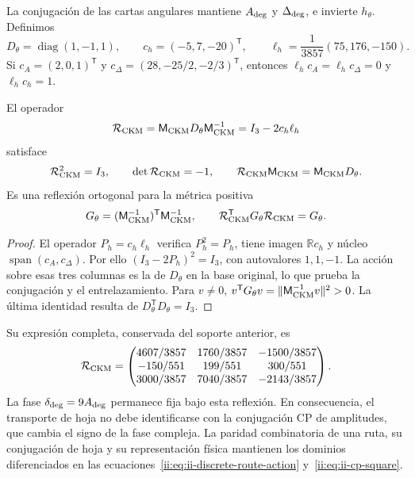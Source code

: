 La conjugación de las cartas angulares mantiene \(A_{\rm deg}\) y
\(\Delta_{\rm deg}\), e invierte \(h_\theta\). Definimos
\begin{equation}
 D_\theta=\operatorname{diag}(1,-1,1),\qquad
 c_h=(-5,7,-20)^{\mathsf T},\qquad
 \ell_h=\frac1{3857}(75,176,-150).
 \label{ii:eq:ii-ckm-sheet-data}
\end{equation}
Si \(c_A=(2,0,1)^{\mathsf T}\) y
\(c_\Delta=(28,-25/2,-2/3)^{\mathsf T}\), entonces
\(\ell_hc_A=\ell_hc_\Delta=0\) y \(\ell_hc_h=1\).

\begin{theorem}
El operador
\begin{equation}
 \mathcal R_{\rm CKM}
 =\mathsf M_{\rm CKM}D_\theta\mathsf M_{\rm CKM}^{-1}
 =I_3-2c_h\ell_h
 \label{ii:eq:ii-ckm-reflection}
\end{equation}
satisface
\begin{equation}
 \mathcal R_{\rm CKM}^2=I_3,\qquad
 \det\mathcal R_{\rm CKM}=-1,\qquad
 \mathcal R_{\rm CKM}\mathsf M_{\rm CKM}
 =\mathsf M_{\rm CKM}D_\theta.
 \label{ii:eq:ii-ckm-intertwining}
\end{equation}
Es una reflexión ortogonal para la métrica positiva
\begin{equation}
 G_\theta=(\mathsf M_{\rm CKM}^{-1})^{\mathsf T}
                 \mathsf M_{\rm CKM}^{-1},\qquad
 \mathcal R_{\rm CKM}^{\mathsf T}G_\theta\mathcal R_{\rm CKM}=G_\theta.
 \label{ii:eq:ii-ckm-metric}
\end{equation}
\end{theorem}

\begin{proof}
El operador \(P_h=c_h\ell_h\) verifica \(P_h^2=P_h\), tiene imagen
\(\mathbb Rc_h\) y núcleo \(\operatorname{span}(c_A,c_\Delta)\).
Por ello \((I_3-2P_h)^2=I_3\), con autovalores \(1,1,-1\).
La acción sobre esas tres columnas es la de \(D_\theta\) en la base
original, lo que prueba la conjugación y el entrelazamiento.
Para \(v\ne0\),
\(v^{\mathsf T}G_\theta v=\|\mathsf M_{\rm CKM}^{-1}v\|^2>0\).
La última identidad resulta de \(D_\theta^{\mathsf T}D_\theta=I_3\).
\end{proof}

Su expresión completa, conservada del soporte anterior, es
\begin{equation}
 \mathcal R_{\rm CKM}=
 \begin{pmatrix}
 4607/3857&1760/3857&-1500/3857\\
 -150/551&199/551&300/551\\
 3000/3857&7040/3857&-2143/3857
 \end{pmatrix}.
 \label{ii:eq:ii-ckm-reflection-matrix}
\end{equation}
La fase \(\delta_{\rm deg}=9A_{\rm deg}\) permanece fija bajo esta
reflexión. En consecuencia, el transporte de hoja no debe identificarse
con la conjugación CP de amplitudes, que cambia el signo de la fase compleja.
La paridad combinatoria de una ruta, su conjugación de hoja y su
representación física mantienen los dominios diferenciados en
las ecuaciones~\eqref{ii:eq:ii-discrete-route-action} y~\eqref{ii:eq:ii-cp-square}.

